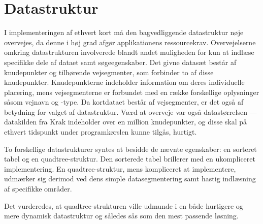 \section{Datastruktur}
\label{sec:datastruktur}
I implementeringen af ethvert kort må den bagvedliggende datastruktur nøje overvejes, da denne i høj grad afgør applikationens ressourcekrav. Overvejelserne omkring datastrukturen involverede blandt andet muligheden for kun at indlæse specifikke dele af dataet samt søgeegenskaber. Det givne datasæt består af knudepunkter og tilhørende vejsegmenter, som forbinder to af disse knudepunkter. Knudepunkterne indeholder information om deres individuelle placering, mens vejsegmenterne er forbundet med en række forskellige oplysninger såsom vejnavn og -type. Da kortdataet består af vejsegmenter, er det også af betydning for valget af datastruktur. Værd at overveje var også datastørrelsen --- datakilden fra Krak indeholder over en million knudepunkter, og disse skal på ethvert tidspunkt under programkørslen kunne tilgås, hurtigt.

To forskellige datastrukturer syntes at besidde de nævnte egenskaber: en sorteret tabel og en quadtree-struktur. Den sorterede tabel brillerer med en ukompliceret implementering. En quadtree-struktur, mens kompliceret at implementere, udmærker sig derimod ved dens simple datasegmentering samt hastig indlæsning af specifikke områder. 

Det vurderedes, at quadtree-strukturen ville udmunde i en både hurtigere og mere dynamisk datastruktur og således sås som den mest passende løsning.

